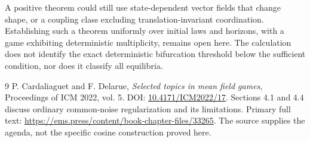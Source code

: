 \documentclass[11pt,a4paper]{article}
\theoremstyle{remark}
\begin{document}
A positive theorem could still use state-dependent vector fields that change shape, or a coupling class excluding translation-invariant coordination. Establishing such a theorem uniformly over initial laws and horizons, with a game exhibiting deterministic multiplicity, remains open here. The calculation does not identify the exact deterministic bifurcation threshold below the sufficient condition, nor does it classify all equilibria.

\begin{thebibliography}{9}
 P. Cardaliaguet and F. Delarue, \emph{Selected topics in mean field games}, Proceedings of ICM 2022, vol. 5. DOI: \href{https://doi.org/10.4171/ICM2022/17}{10.4171/ICM2022/17}. Sections 4.1 and 4.4 discuss ordinary common-noise regularization and its limitations. Primary full text: \url{https://ems.press/content/book-chapter-files/33265}. The source supplies the agenda, not the specific cosine construction proved here.
\end{thebibliography}
\end{document}
